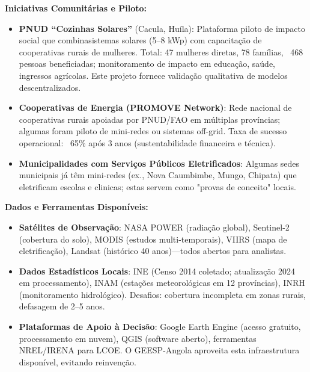 \documentclass[12pt, a4paper]{article}
\begin{document}
\textbf{Iniciativas Comunitárias e Piloto:}
\begin{itemize}
\item \textbf{PNUD ``Cozinhas Solares''}  (Cacula, Huíla): Plataforma piloto de impacto social que combinasistemas solares (5--8 kWp) com capacitação de cooperativas rurais de mulheres. Total: 47 mulheres diretas, 78 famílias, ~468 pessoas beneficiadas; monitoramento de impacto em educação, saúde, ingressos agrícolas. Este projeto fornece validação qualitativa de modelos descentralizados.
\item \textbf{Cooperativas de Energia (PROMOVE Network)}: Rede nacional de cooperativas rurais apoiadas por PNUD/FAO em múltiplas províncias; algumas foram piloto de mini-redes ou sistemas off-grid. Taxa de sucesso operacional: ~65\% após 3 anos (sustentabilidade financeira e técnica).
\item \textbf{Municipalidades com Serviços Públicos Eletrificados}: Algumas sedes municipais já têm mini-redes (ex., Nova Caumbimbe, Mungo, Chipata) que eletrificam escolas e clinicas; estas servem como "provas de conceito" locais.
\end{itemize}

\textbf{Dados e Ferramentas Disponíveis:}
\begin{itemize}
\item \textbf{Satélites de Observação}: NASA POWER (radiação global), Sentinel-2 (cobertura do solo), MODIS (estudos multi-temporais), VIIRS (mapa de eletrificação), Landsat (histórico 40 anos)—todos abertos para analistas.
\item \textbf{Dados Estadísticos Locais}: INE (Censo 2014 coletado; atualização 2024 em processamento), INAM (estações meteorológicas em 12 províncias), INRH (monitoramento hidrológico). Desafios: cobertura incompleta em zonas rurais, defasagem de 2--5 anos.
\item \textbf{Plataformas de Apoio à Decisão}: Google Earth Engine (acesso gratuito, processamento em nuvem), QGIS (software aberto), ferramentas NREL/IRENA para LCOE. O GEESP-Angola aproveita esta infraestrutura disponível, evitando reinvenção.
\end{itemize}
\end{document}
